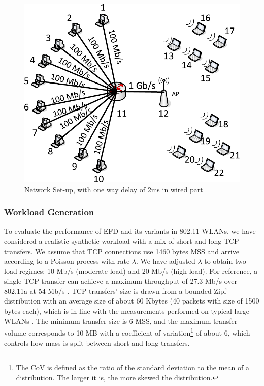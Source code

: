 \documentclass[preprint,12pt]{elsarticle}
\begin{document}
\begin{figure}[!ht]
   \centering
    \includegraphics[width=0.5 \textwidth]{./fig/wireless/setup/wlan_topology_bandwidth}
  \caption{Network Set-up, with one way delay of 2ms in wired part}
  \label{fig:setup}  
\end{figure}

\subsubsection{Workload Generation}

To evaluate the performance of EFD and its variants in 802.11 WLANs, we have considered a realistic synthetic workload with a mix of short and long TCP transfers. We assume that TCP connections use 1460 bytes MSS and arrive according to a Poisson process with rate $\lambda$. We have adjusted $\lambda$ to obtain two load regimes: 10 Mb/s (moderate load) and 20 Mb/s (high load). For reference, a single TCP transfer can achieve a maximum throughput of 27.3 Mb/s over 802.11a at 54 Mb/s \cite{Matthew2003}. TCP transfers'  size is drawn from a bounded Zipf distribution with an average size of about 60 Kbytes (40 packets with size of 1500 bytes each), which is in line with the measurements performed on typical large WLANs \cite{MengWYL04}. The minimum transfer size is 6 MSS, and the maximum transfer volume corresponds to 10 MB with a coefficient of variation\footnote{The CoV is defined as the ratio of the standard deviation to the mean of a distribution. The larger it is, the more skewed the distribution. } of about 6, which controls how  mass is split between short and long transfers. %
\end{document}
